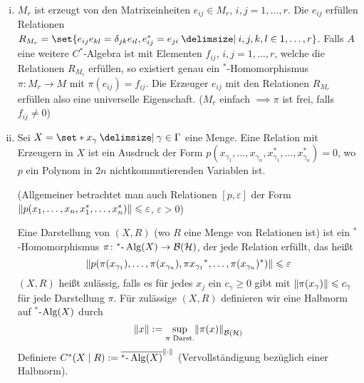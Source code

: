 \begin{beispiel}
	\leavevmode
	\begin{enumerate}[(i)]
		\item $M_r$ ist erzeugt von den Matrixeinheiten $e_{ij} \in M_r$, $i,j=1,\ldots ,r$.
		Die $e_{ij}$ erfüllen Relationen $R_{M_r}=\set{e_{ij} e_{kl}=\delta_{jk} e_{il}, e_{ij}^*= e_{ji} \given  i,j,k,l \in 1,\ldots ,r}$.
		Falls $A$ eine weitere $C^*$-Algebra ist mit Elementen  $f_{ij}$, $i,j=1,\ldots,r$, welche die Relationen $R_{M_r}$ erfüllen, so existiert genau ein $^*$-Homomorphismus $\pi \colon M_r \to M$ mit $\pi(e_{ij})=f_{ij}$.
		Die Erzeuger $e_{ij}$ mit den Relationen $R_{M_r}$ erfüllen also eine universelle Eigenschaft.
		($M_r$ einfach $\implies \pi$ ist frei, falls $f_{ij}\neq 0$)
		\item Sei $X=\set*{x_\gamma \given \gamma \in \Gamma}$ eine Menge.
		Eine Relation mit Erzeugern in $X$ ist ein Ausdruck der Form $p(x_{\gamma_1}, \ldots ,x_{\gamma_n}, x_{\gamma_1}^*, \ldots , x_{\gamma_n}^*)=0$, wo $p$ ein Polynom in $2n$ nichtkommutierenden Variablen ist.
		
		(Allgemeiner betrachtet man auch Relationen $[p,\varepsilon]$ der Form $\norm*{p(x_1,\ldots ,x_n,x_1^*,\ldots ,x_n^*)} \le \varepsilon$, $\varepsilon>0$)
		
		Eine Darstellung von $(X,R)$ (wo $R$ eine Menge von Relationen ist) ist ein $^*$-Homomorphismus $\pi \colon ^*\text{-}\Alg(X) \to \mathcal{B}(\mathcal{H})$, der jede Relation erfüllt, das heißt 
		\[
			\norm*{p\enbrace*{\pi(x_{\gamma_1}) , \ldots , \pi(x_{\gamma_n}), \pi{x_{\gamma_1}}^* ,\ldots , \pi(x_{\gamma_n})^*}} \le \varepsilon
		\]
		$(X,R)$ heißt zulässig, falls es für jedes $x_j$ ein $c_\gamma \ge 0$ gibt mit $\norm*{\pi(x_\gamma)} \le c_\gamma$ für jede Darstellung $\pi$.
		Für zulässige $(X,R)$ definieren wir eine Halbnorm auf $^*$-$\Alg(X)$ durch 
		\[
			\norm*{x} := \sup_{\pi \text{ Darst.}} \norm*{\pi(x)}_{\mathcal{B}(\mathcal{H})}
		\]
		Definiere $C^*(X\mid R) := \overline{^*\text{-}\Alg(X)}^{\norm*{\cdot}}$ (Vervollständigung bezüglich einer Halbnorm).
	\end{enumerate}
\end{beispiel}











\cleardoubleoddemptypage
{}
\setcounter{page}{1}
\cleardoubleoddemptypage
\appendix

